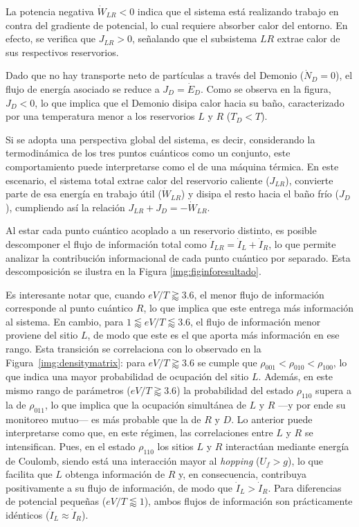 La potencia negativa $\dot{W}_{LR} < 0$ indica que el sistema está realizando trabajo en contra del gradiente de potencial, lo cual requiere absorber calor del entorno. En efecto, se verifica que $J_{LR} > 0$, señalando que el subsistema $LR$ extrae calor de sus respectivos reservorios.

Dado que no hay transporte neto de partículas a través del Demonio ($\dot{N}_{D} = 0$), el flujo de energía asociado se reduce a $J_{D} = \dot{E}_{D}$. Como se observa en la figura, $J_{D} < 0$, lo que implica que el Demonio disipa calor hacia su baño, caracterizado por una temperatura menor a los reservorios $L$ y $R$ ($T_D < T$). 

Si se adopta una perspectiva global del sistema, es decir, considerando la termodinámica de los tres puntos cuánticos como un conjunto, este comportamiento puede interpretarse como el de una máquina térmica. En este escenario, el sistema total extrae calor del reservorio caliente (\( J_{LR} \)), convierte parte de esa energía en trabajo útil (\( \dot{W}_{LR} \)) y disipa el resto hacia el baño frío (\( J_D \)), cumpliendo así la relación \( J_{LR} + J_D = -\dot{W}_{LR} \).

Al estar cada punto cuántico acoplado a un reservorio distinto, es posible descomponer el flujo de información total como $\dot{I}_{LR} = \dot{I}_{L} + \dot{I}_{R}$, lo que permite analizar la contribución informacional de cada punto cuántico por separado. Esta descomposición se ilustra en la Figura \ref{img:figinforesultado}.



Es interesante notar que, cuando \( eV/T \gtrapprox 3.6 \), el menor flujo de información corresponde al punto cuántico \( R \), lo que implica que este entrega más información al sistema. En cambio, para \( 1 \lessapprox eV/T \lessapprox 3.6 \), el flujo de información menor proviene del sitio \( L \), de modo que este es el que aporta más información en ese rango. Esta transición se correlaciona con lo observado en la Figura~\ref{img:densitymatrix}: para \( eV/T \gtrapprox 3.6 \) se cumple que \(\rho_{001} < \rho_{010} < \rho_{100}\), lo que indica una mayor probabilidad de ocupación del sitio \( L \). Además, en este mismo rango de parámetros  ($eV/T \gtrapprox 3.6$) la probabilidad del estado \( \rho_{110} \) supera a la de \( \rho_{011} \), lo que implica que la ocupación simultánea de \( L \) y \( R \) ---y por ende su monitoreo mutuo--- es más probable que la de \( R \) y \( D \). Lo anterior puede interpretarse como que, en este régimen, las correlaciones entre \( L \) y \( R \) se intensifican. Pues, en el estado \( \rho_{110} \) los sitios \( L \) y \( R \) interactúan mediante energía de Coulomb, siendo está una interacción mayor al \textit{hopping} ($U_{f}>g$), lo que facilita que \( L \) obtenga información de \( R \) y, en consecuencia, contribuya positivamente a su flujo de información, de modo que \( \dot{I}_{L} > \dot{I}_{R} \). Para diferencias de potencial pequeñas (\( eV/T \lessapprox 1 \)), ambos flujos de información son prácticamente idénticos (\( \dot{I}_{L} \approx \dot{I}_{R} \)).

